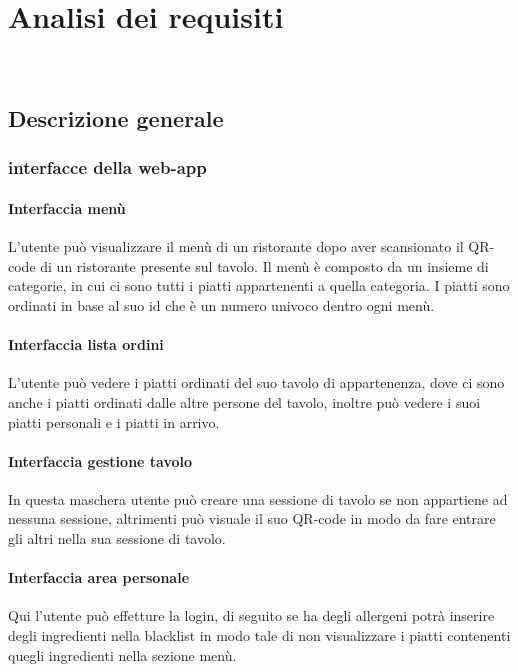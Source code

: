 
\chapter{Analisi dei requisiti}
\label{cap:analisi dei requisiti}

\\

\section{Descrizione generale}
\subsection{interfacce della web-app}
\subsubsection{Interfaccia menù}
L'utente può visualizzare il menù di un ristorante dopo aver scansionato il QR-code di un ristorante presente sul tavolo. Il menù è composto da un insieme di categorie, in cui ci sono tutti i piatti appartenenti a quella categoria. I piatti sono ordinati in base al suo id che è un numero univoco dentro ogni menù.
\subsubsection{Interfaccia lista ordini}
L'utente può vedere i piatti ordinati del suo tavolo di appartenenza, dove ci sono anche i piatti ordinati dalle altre persone del tavolo, inoltre può vedere i suoi piatti personali e i piatti in arrivo.
\subsubsection{Interfaccia gestione tavolo}
In questa maschera utente può creare una sessione di tavolo se non appartiene ad nessuna sessione, altrimenti può visuale il suo QR-code in modo da fare entrare gli altri nella sua sessione di tavolo.
\subsubsection{Interfaccia area personale}
Qui l'utente può effetture la login, di seguito se ha degli allergeni potrà inserire degli ingredienti nella blacklist\gl{} in modo tale di non visualizzare i piatti contenenti quegli ingredienti nella sezione menù.
